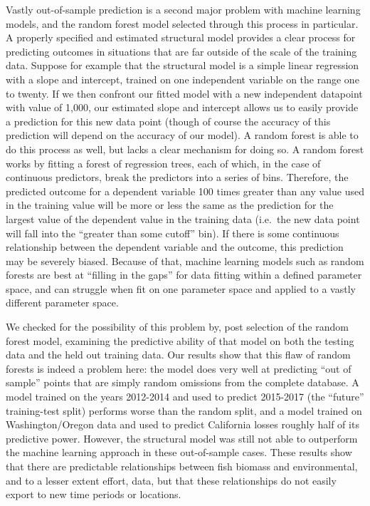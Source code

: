 \documentclass[twoside,12pt,final]{ucthesis-CA2012}
\begin{document}
\begin{ucmainmatter}
Vastly out-of-sample prediction is a second major problem with machine
learning models, and the random forest model selected through this
process in particular. A properly specified and estimated structural
model provides a clear process for predicting outcomes in situations
that are far outside of the scale of the training data. Suppose for
example that the structural model is a simple linear regression with a
slope and intercept, trained on one independent variable on the range
one to twenty. If we then confront our fitted model with a new
independent datapoint with value of 1,000, our estimated slope and
intercept allows us to easily provide a prediction for this new data
point (though of course the accuracy of this prediction will depend on
the accuracy of our model). A random forest is able to do this process
as well, but lacks a clear mechanism for doing so. A random forest works
by fitting a forest of regression trees, each of which, in the case of
continuous predictors, break the predictors into a series of bins.
Therefore, the predicted outcome for a dependent variable 100 times
greater than any value used in the training value will be more or less
the same as the prediction for the largest value of the dependent value
in the training data (i.e.~the new data point will fall into the
``greater than some cutoff'' bin). If there is some continuous
relationship between the dependent variable and the outcome, this
prediction may be severely biased. Because of that, machine learning
models such as random forests are best at ``filling in the gaps'' for
data fitting within a defined parameter space, and can struggle when fit
on one parameter space and applied to a vastly different parameter
space.

We checked for the possibility of this problem by, post selection of the
random forest model, examining the predictive ability of that model on
both the testing data and the held out training data. Our results show
that this flaw of random forests is indeed a problem here: the model
does very well at predicting ``out of sample'' points that are simply
random omissions from the complete database. A model trained on the
years 2012-2014 and used to predict 2015-2017 (the ``future''
training-test split) performs worse than the random split, and a model
trained on Washington/Oregon data and used to predict California losses
roughly half of its predictive power. However, the structural model was
still not able to outperform the machine learning approach in these
out-of-sample cases. These results show that there are predictable
relationships between fish biomass and environmental, and to a lesser
extent effort, data, but that these relationships do not easily export
to new time periods or locations.


\end{ucmainmatter}
\end{document}
